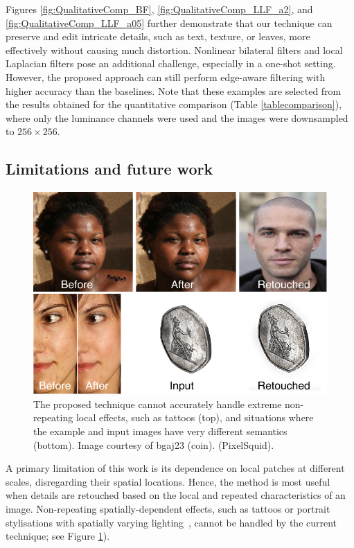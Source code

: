 Figures \ref{fig:QualitativeComp_BF}, \ref{fig:QualitativeComp_LLF_a2}, and \ref{fig:QualitativeComp_LLF_a05} further demonstrate that our technique can preserve and edit intricate details, such as text, texture, or leaves, more effectively without causing much distortion. Nonlinear bilateral filters and local Laplacian filters pose an additional challenge, especially in a one-shot setting. However, the proposed approach can still perform edge-aware filtering with higher accuracy than the baselines. Note that these examples are selected from the results obtained for the quantitative comparison (Table \ref{tablecomparison}), where only the luminance channels were used and the images were downsampled to $256 \times 256$.


\subsection{Limitations and future work}
\begin{figure}[th] %
	\centering
	\includegraphics[width=0.8\columnwidth]{Chapters/detail-retouching-figs/Limitations.pdf}
    \caption{\label{fig:limitations} The proposed technique cannot accurately handle extreme non-repeating local effects, such as tattoos (top), and situations where the example and input images have very different semantics (bottom). Image courtesy of bgaj23 (coin). (PixelSquid).}

\end{figure}
A primary limitation of this work is its dependence on local patches at different scales, disregarding their spatial locations. Hence, the method is most useful when details are retouched based on the local and repeated characteristics of an image. Non-repeating spatially-dependent effects, such as tattoos or portrait stylisations with spatially varying lighting~\cite{Shih14Style}, cannot be handled by the current technique; see Figure \ref{fig:limitations}).

